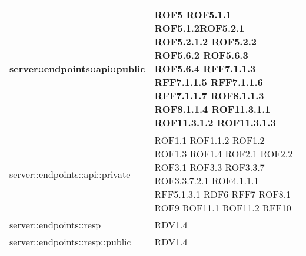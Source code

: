 \begin{center}
\begin{longtable}{| p{9cm} | p{4cm} |}
server::endpoints::api::public  &  ROF5 \newline ROF5.1.1 \newline ROF5.1.2\newline ROF5.2.1 \newline ROF5.2.1.2 \newline ROF5.2.2 \newline ROF5.6.2 \newline ROF5.6.3 \newline ROF5.6.4 \newline RFF7.1.1.3 \newline RFF7.1.1.5 \newline RFF7.1.1.6 \newline RFF7.1.1.7 \newline ROF8.1.1.3 \newline  ROF8.1.1.4 \newline ROF11.3.1.1 \newline ROF11.3.1.2 \newline ROF11.3.1.3  \newline \\
\hline
server::endpoints::api::private  &  ROF1.1 \newline ROF1.1.2 \newline ROF1.2 \newline ROF1.3 \newline ROF1.4 \newline ROF2.1 \newline ROF2.2 \newline ROF3.1 \newline ROF3.3 \newline ROF3.3.7 \newline ROF3.3.7.2.1 \newline ROF4.1.1.1 \newline RFF5.1.3.1 \newline RDF6 \newline RFF7 \newline ROF8.1 \newline ROF9 \newline ROF11.1 \newline ROF11.2  \newline RFF10 \newline \\
\hline
server::endpoints::resp  &  RDV1.4 \newline \\
\hline
server::endpoints::resp::public  &  RDV1.4 \newline \\

\end{longtable}
\end{center}
